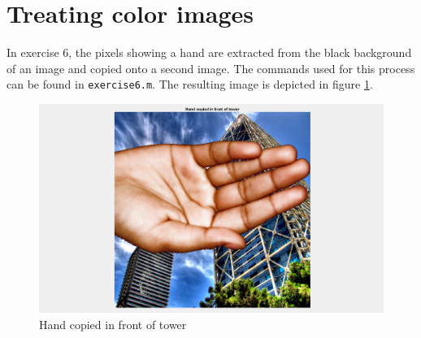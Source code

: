 \section{Treating color images}

In exercise 6, the pixels showing a hand are extracted from the black background of an image and copied onto a second image. The commands used for this process can be found in \texttt{exercise6.m}. The resulting image is depicted in figure \ref{fig:task22}.

\begin{figure}[!hbt]
  \includegraphics[width=\textwidth]{./img/task22.png}
  \caption{Hand copied in front of tower}
  \label{fig:task22}
\end{figure}